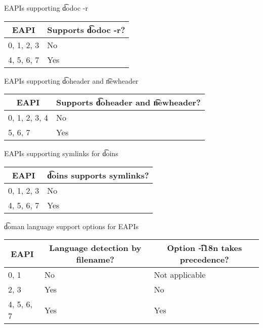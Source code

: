 \begin{centertable}{EAPIs supporting \t{dodoc -r}}
    \label{tab:dodoc-table}
    \begin{tabular}{ll}
      \toprule
      \multicolumn{1}{c}{\textbf{EAPI}} &
      \multicolumn{1}{c}{\textbf{Supports \t{dodoc -r}?}} \\
      \midrule
      0, 1, 2, 3        & No  \\
      4, 5, 6, 7        & Yes \\
      \bottomrule
    \end{tabular}
\end{centertable}

\begin{centertable}{EAPIs supporting \t{doheader} and \t{newheader}}
    \label{tab:doheader-table}
    \begin{tabular}{ll}
      \toprule
      \multicolumn{1}{c}{\textbf{EAPI}} &
      \multicolumn{1}{c}{\textbf{Supports \t{doheader} and \t{newheader}?}} \\
      \midrule
      0, 1, 2, 3, 4     & No  \\
      5, 6, 7           & Yes \\
      \bottomrule
    \end{tabular}
\end{centertable}

\begin{centertable}{EAPIs supporting symlinks for \t{doins}}
    \label{tab:doins-table}
    \begin{tabular}{ll}
      \toprule
      \multicolumn{1}{c}{\textbf{EAPI}} &
      \multicolumn{1}{c}{\textbf{\t{doins} supports symlinks?}} \\
      \midrule
      0, 1, 2, 3        & No  \\
      4, 5, 6, 7        & Yes \\
      \bottomrule
    \end{tabular}
\end{centertable}

\begin{centertable}{\t{doman} language support options for EAPIs}
    \label{tab:doman-table}
    \begin{tabular}{lll}
      \toprule
      \multicolumn{1}{c}{\textbf{EAPI}} &
      \multicolumn{1}{c}{\textbf{Language detection by filename?}} &
      \multicolumn{1}{c}{\textbf{Option \t{-i18n} takes precedence?}} \\
      \midrule
      0, 1              & No  & Not applicable \\
      2, 3              & Yes & No             \\
      4, 5, 6, 7        & Yes & Yes            \\
      \bottomrule
    \end{tabular}
\end{centertable}

